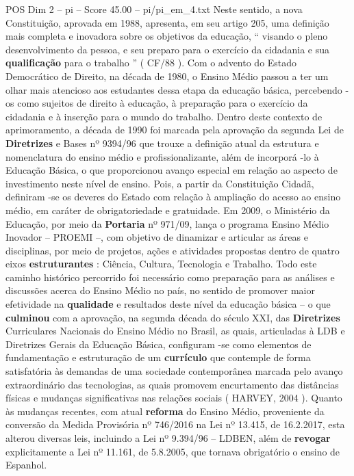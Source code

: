 \begin{textsample}{POS Dim 2 – pi – Score 45.00 – pi/pi\_em\_4.txt}
Neste sentido, a nova Constituição, aprovada em 1988, apresenta, em seu artigo 205, uma definição mais completa e inovadora sobre os objetivos da educação, “ visando o pleno desenvolvimento da pessoa, e seu preparo para o exercício da cidadania e sua \textbf{qualificação} para o trabalho ” ( CF/88 ).
Com o advento do Estado Democrático de Direito, na década de 1980, o Ensino Médio passou a ter um olhar mais atencioso aos estudantes dessa etapa da educação básica, percebendo -os como sujeitos de direito à educação, à preparação para o exercício da cidadania e à inserção para o mundo do trabalho.
Dentro deste contexto de aprimoramento, a década de 1990 foi marcada pela aprovação da segunda Lei de \textbf{Diretrizes} e Bases nº 9394/96 que trouxe a definição atual da estrutura e nomenclatura do ensino médio e profissionalizante, além de incorporá -lo à Educação Básica, o que proporcionou avanço especial em relação ao aspecto de investimento neste nível de ensino.
Pois, a partir da Constituição Cidadã, definiram -se os deveres do Estado com relação à ampliação do acesso ao ensino médio, em caráter de obrigatoriedade e gratuidade.
Em 2009, o Ministério da Educação, por meio da \textbf{Portaria} nº 971/09, lança o programa Ensino Médio Inovador – PROEMI –, com objetivo de dinamizar e articular as áreas e disciplinas, por meio de projetos, ações e atividades propostas dentro de quatro eixos \textbf{estruturantes} : Ciência, Cultura, Tecnologia e Trabalho.
Todo este caminho histórico percorrido foi necessário como preparação para as análises e discussões acerca do Ensino Médio no país, no sentido de promover maior efetividade na \textbf{qualidade} e resultados deste nível da educação básica – o que \textbf{culminou} com a aprovação, na segunda década do século XXI, das \textbf{Diretrizes} Curriculares Nacionais do Ensino Médio no Brasil, as quais, articuladas à LDB e Diretrizes Gerais da Educação Básica, configuram -se como elementos de fundamentação e estruturação de um \textbf{currículo} que contemple de forma satisfatória às demandas de uma sociedade contemporânea marcada pelo avanço extraordinário das tecnologias, as quais promovem encurtamento das distâncias físicas e mudanças significativas nas relações sociais ( HARVEY, 2004 ).
Quanto às mudanças recentes, com atual \textbf{reforma} do Ensino Médio, proveniente da conversão da Medida Provisória nº 746/2016 na Lei nº 13.415, de 16.2.2017, esta alterou diversas leis, incluindo a Lei nº 9.394/96 – LDBEN, além de \textbf{revogar} explicitamente a Lei nº 11.161, de 5.8.2005, que tornava obrigatório o ensino de Espanhol.

\end{textsample}
